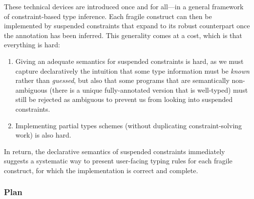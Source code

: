 \documentclass[acmsmall,screen,nonacm,review]{acmart}
\begin{document}
These technical devices are introduced once and for all---in a general
framework of constraint-based type inference. Each fragile \ML construct can
then be implemented by suspended constraints that expand to its robust
counterpart once the annotation has been inferred. This generality comes at
a cost, which is that everything is hard:
\begin{enumerate}

\item
  Giving an adequate semantics for suspended constraints is hard, as we
  must capture declaratively the intuition that some type information must be
  \emph{known} rather than \emph{guessed}, but also that some programs
  that are semantically non-ambiguous (there is a unique fully-annotated
  version that is well-typed) must still be rejected as ambiguous to prevent
  us from looking into suspended constraints.

\item
  Implementing partial types schemes (without duplicating constraint-solving
  work) is also hard.

\end{enumerate}
In return, the declarative semantics of suspended constraints
immediately suggests a systematic way to present user-facing typing rules
for each fragile construct, for which the implementation is correct and
complete.

\subsubsection* {Plan}
\end{document}

